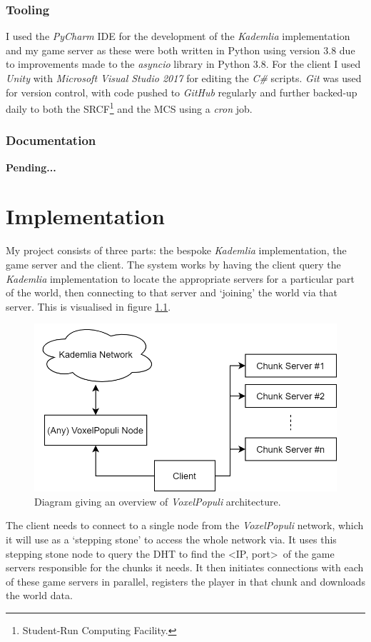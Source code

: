 \documentclass[12pt,notitlepage,a4paper]{report}
\newcommand{\unity}{\emph{Unity}}
\newcommand{\kademlia}{\emph{Kademlia}}
\newcommand{\voxpop}{\emph{VoxelPopuli}}
\begin{document}
	\subsection{Tooling}
	I used the \emph{PyCharm} IDE for the development of the \kademlia{} implementation and my game server as these were both written in Python using version $3.8$ due to improvements made to the \emph{asyncio} library in Python $3.8$. For the client I used \unity{} with \emph{Microsoft Visual Studio 2017} for editing the \emph{C\#} scripts. \emph{Git} was used for version control, with code pushed to \emph{GitHub} regularly and further backed-up daily to both the SRCF\footnote{Student-Run Computing Facility.} and the MCS using a \emph{cron} job.
	
	\subsection{Documentation}
	\textbf{Pending...}	
	
	\clearpage
	\chapter{Implementation}
	My project consists of three parts: the bespoke \kademlia{} implementation, the game server and the client. The system works by having the client query the \kademlia{} implementation to locate the appropriate servers for a particular part of the world, then connecting to that server and `joining' the world via that server. This is visualised in figure \ref{fig:diagram1}.
	
	\begin{figure}
		\includegraphics[width=\textwidth]{diag1.png}
		\caption{Diagram giving an overview of \voxpop{} architecture.}
		\label{fig:diagram1}
	\end{figure}
	The client needs to connect to a single node from the \voxpop{} network, which it will use as a `stepping stone' to access the whole network via. It uses this stepping stone node to query the DHT to find the \textless IP, port\textgreater~of the game servers responsible for the chunks it needs. It then initiates connections with each of these game servers in parallel, registers the player in that chunk and downloads the world data.
	
\end{document}
